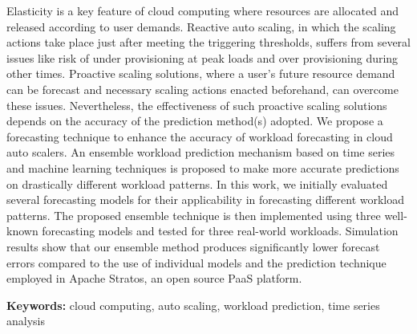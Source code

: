 Elasticity is a key feature of cloud computing where resources are allocated and released according to user demands. Reactive auto scaling, in which the scaling actions take place just after meeting the triggering thresholds, suffers from several issues like risk of under provisioning at peak loads and over provisioning during other times. Proactive scaling solutions, where a user's future resource demand can be forecast and necessary scaling actions enacted beforehand, can overcome these issues. Nevertheless, the effectiveness of such proactive scaling solutions depends on the accuracy of the prediction method(s) adopted. We propose a forecasting technique to enhance the accuracy of workload forecasting in cloud auto scalers. An ensemble workload prediction mechanism based on time series and machine learning techniques is proposed to make more accurate predictions on drastically different workload patterns. In this work, we initially evaluated several forecasting models for their applicability in forecasting different workload patterns. The proposed ensemble technique is then implemented using three well-known forecasting models and tested for three real-world workloads. Simulation results show that our ensemble method produces significantly lower forecast errors compared to the use of individual models and the prediction technique employed in Apache Stratos, an open source PaaS platform.

{\bf Keywords:} cloud computing, auto scaling, workload prediction, time series analysis